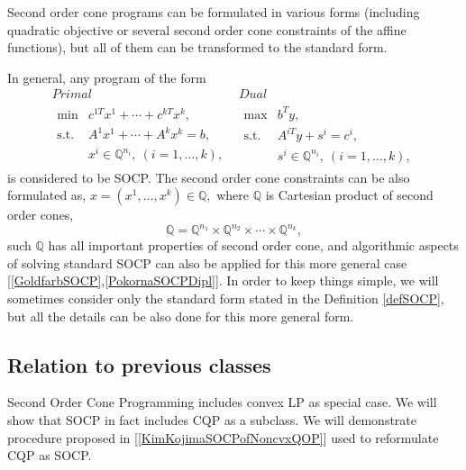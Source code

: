 \documentclass[12pt]{book}
\theoremstyle{definition}
\begin{document}
\rem Second order cone programs can be formulated in various forms (including quadratic objective or several second order cone constraints of the affine functions), but all of them can be transformed to the standard form. 

\rem In general, any program of the form 
\begin{equation}
\begin{array}{cc}
Primal & Dual \\
\begin{array}{ll}
\mbox{min} &  c^{1T}x^1+\cdots + c^{kT}x^k,\\
\mbox{s.t.}& A^1x^1+ \cdots + A^kx^k = b, \\
& x^i \in \mathbb{Q}^{n_i}, \ (i = 1,\dots ,k),
\end{array} 
 & 
 \begin{array}{ll}
\mbox{max} & b^Ty,\\
\mbox{s.t.}& A^{iT}y + s^i = c^i, \\ %
& s^i \in \mathbb{Q}^{n_i}, \ (i = 1,\dots ,k),
\end{array}
\end{array}
\label{genSOCP}
\end{equation}
is considered to be SOCP.
The second order cone constraints can be also formulated as, $x = (x^1,\dots ,x^k) \in \mathbb{Q},$ where $\mathbb{Q}$ is Cartesian product of second order cones, 
\begin{equation}
\mathbb{Q} = \mathbb{Q}^{n_1}\times \mathbb{Q}^{n_2}\times \cdots \times \mathbb{Q}^{n_k},
\end{equation}
 such $\mathbb{Q}$ has all important properties of second order cone, 
and algorithmic aspects of solving standard SOCP can also be applied for this more general case [\ref{GoldfarbSOCP},\ref{PokornaSOCPDipl}].
In order to keep things simple, we will sometimes consider only the standard form stated in the Definition \ref{defSOCP}, but all the details can be also done for this more general form.


\subsection{Relation to previous classes}
\label{SectionRelBtwSOCPandQCQP}

Second Order Cone Programming includes convex LP as special case.
We will show that SOCP in fact includes CQP as a subclass. We will demonstrate procedure proposed in [\ref{KimKojimaSOCPofNoncvxQOP}] used to reformulate CQP as SOCP.
\end{document}
